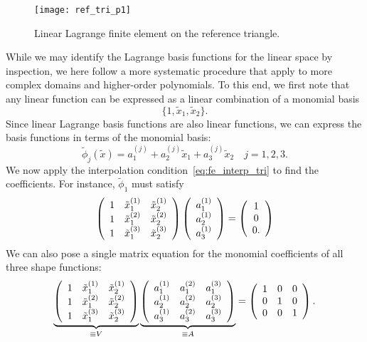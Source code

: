 \begin{figure}
  \centering
  \texttt{[image: ref\_tri\_p1]}
  \caption{Linear Lagrange finite element on the reference triangle.}
  \label{fig:fe_ref_tri_p1}
\end{figure}


    While we may identify the Lagrange basis functions for the linear space by inspection, we here follow a more systematic procedure that apply to more complex domains and higher-order polynomials.  To this end, we first note that any linear function can be expressed as a linear combination of a monomial basis
\begin{equation*}
  \{ 1, \tilde x_1, \tilde x_2\}.
\end{equation*}
Since linear Lagrange basis functions are also linear functions, we can express the basis functions in terms of the monomial basis:
\begin{equation}
  \tilde \phi_j(\tilde x) = a^{(j)}_1 + a^{(j)}_2 \tilde x_1 + a_3^{(j)} \tilde x_2 \quad j = 1, 2, 3.
  \label{eq:fe_lin_tri_rep}
\end{equation}
We now apply the interpolation condition~\eqref{eq:fe_interp_tri} to find the coefficients.  For instance, $\tilde \phi_1$ must satisfy
\begin{equation*}
  \bmat{ccc}
  1 & \tilde x_1^{(1)} & \tilde x_2^{(1)} \\
  1 & \tilde x_1^{(2)} & \tilde x_2^{(2)} \\
  1 & \tilde x_1^{(3)} & \tilde x_2^{(3)} \\
  \emat
  \bmat{ccc}
  a_1^{(1)} \\ a_2^{(1)} \\ a_3^{(1)}
  \emat
  =
  \bmat{ccc}
  1 \\ 0 \\ 0.
  \emat
\end{equation*}
We can also pose a single matrix equation for the monomial coefficients of all three shape functions: 
\begin{equation*}
  \underbrace{ \bmat{ccc}
      1 & \tilde x_1^{(1)} & \tilde x_2^{(1)} \\
  1 & \tilde x_1^{(2)} & \tilde x_2^{(2)} \\
  1 & \tilde x_1^{(3)} & \tilde x_2^{(3)} \\
  \emat }_{\equiv V}
  \underbrace{ 
  \bmat{ccc}
  a_1^{(1)} & a_1^{(2)} & a_1^{(3)} \\
  a_2^{(1)} & a_2^{(2)} & a_2^{(3)} \\
  a_3^{(1)} & a_3^{(2)} & a_3^{(3)} \\
  \emat
  }_{\equiv A}
  =
  \bmat{ccc}
  1 & 0 & 0 \\
  0 & 1 & 0 \\
  0 & 0 & 1
  \emat.
\end{equation*}
